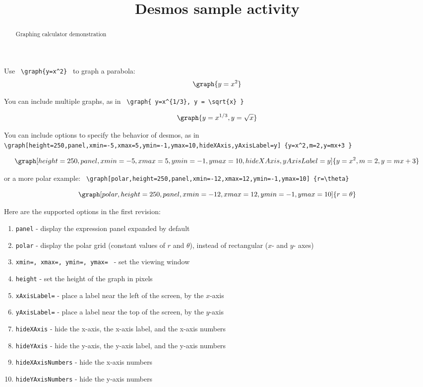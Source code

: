 \documentclass[handout]{ximera}
\title{Desmos sample activity}
\begin{document}
\begin{abstract} Graphing calculator demonstration
\end{abstract}


\maketitle

Use \verb! \graph{y=x^2} ! to graph a parabola:
\[ \graph{y=x^2} \]

You can include multiple graphs, as in \verb! \graph{ y=x^{1/3}, y = \sqrt{x} } !

\[\graph{ y=x^{1/3}, y = \sqrt{x} } \]

You can include options to specify the behavior of desmos, as in
\verb! \graph[height=250,panel,xmin=-5,xmax=5,ymin=-1,ymax=10,hideXAxis,yAxisLabel=y] {y=x^2,m=2,y=mx+3 } !

\[ \graph[height=250,panel,xmin=-5,xmax=5,ymin=-1,ymax=10,hideXAxis,yAxisLabel=y] {y=x^2,m=2,y=mx+3 } \]

or a more polar example: \verb! \graph[polar,height=250,panel,xmin=-12,xmax=12,ymin=-1,ymax=10] {r=\theta} !

\[ \graph[polar,height=250,panel,xmin=-12,xmax=12,ymin=-1,ymax=10] {r=\theta} \]

Here are the supported options in the first revision:

\begin{enumerate}
\item \texttt{panel} - display the expression panel expanded by default
\item \texttt{polar} - display the polar grid (constant values of $r$ and $\theta$), instead of rectangular ($x$- and $y$- axes)
\item \texttt{xmin=, xmax=, ymin=, ymax= } - set the viewing window
\item \texttt{height} - set the height of the graph in pixels
\item \texttt{xAxisLabel=} - place a label near the left of the screen, by the $x$-axis
\item \texttt{yAxisLabel=} - place a label near the top of the screen, by the $y$-axis
\item \texttt{hideXAxis} - hide the x-axis, the x-axis label, and the x-axis numbers
\item \texttt{hideYAxis} - hide the y-axis, the y-axis label, and the y-axis numbers
\item \texttt{hideXAxisNumbers} - hide the x-axis numbers
\item \texttt{hideYAxisNumbers} - hide the y-axis numbers
\end{enumerate}
\end{document}
